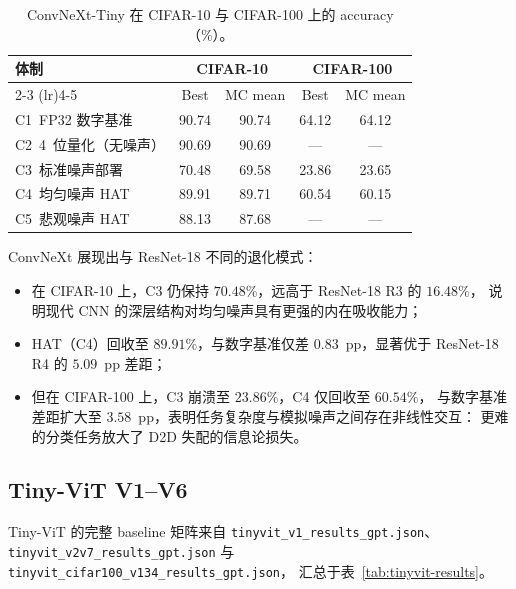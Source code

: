 \begin{table}[htbp]
\centering
\caption{ConvNeXt-Tiny 在 CIFAR-10 与 CIFAR-100 上的 accuracy（\%）。}
\label{tab:convnext-results}
\begin{tabular}{@{}lcccc@{}}
\toprule
\textbf{体制} & \multicolumn{2}{c}{\textbf{CIFAR-10}} & \multicolumn{2}{c}{\textbf{CIFAR-100}} \\
\cmidrule(lr){2-3} \cmidrule(lr){4-5}
& Best & MC mean & Best & MC mean \\
\midrule
C1~FP32 数字基准 & 90.74 & 90.74 & 64.12 & 64.12 \\
C2~4~位量化（无噪声） & 90.69 & 90.69 & --- & --- \\
C3~标准噪声部署 & 70.48 & 69.58 & 23.86 & 23.65 \\
C4~均匀噪声 HAT & 89.91 & 89.71 & 60.54 & 60.15 \\
C5~悲观噪声 HAT & 88.13 & 87.68 & --- & --- \\
\bottomrule
\end{tabular}
\end{table}

ConvNeXt 展现出与 ResNet-18 不同的退化模式：
\begin{itemize}
    \item 在 CIFAR-10 上，C3 仍保持 $70.48\%$，远高于 ResNet-18 R3 的 $16.48\%$，
    说明现代 CNN 的深层结构对均匀噪声具有更强的内在吸收能力；
    \item HAT（C4）回收至 $89.91\%$，与数字基准仅差 $0.83$~pp，显著优于 ResNet-18 R4 的 $5.09$~pp 差距；
    \item 但在 CIFAR-100 上，C3 崩溃至 $23.86\%$，C4 仅回收至 $60.54\%$，
    与数字基准差距扩大至 $3.58$~pp，表明任务复杂度与模拟噪声之间存在非线性交互：
    更难的分类任务放大了 D2D 失配的信息论损失。
\end{itemize}

\subsection{Tiny-ViT V1--V6}

Tiny-ViT 的完整 baseline 矩阵来自 \texttt{tinyvit\_v1\_results\_gpt.json}、\texttt{tinyvit\_v2v7\_results\_gpt.json} 与 \texttt{tinyvit\_cifar100\_v134\_results\_gpt.json}，
汇总于表~\ref{tab:tinyvit-results}。

